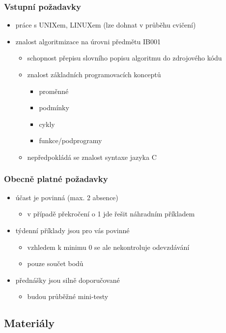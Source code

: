 \begin{frame}
	\frametitle{Vstupní požadavky}
	\begin{itemize}
		\item{práce s UNIXem, LINUXem (lze dohnat v průběhu cvičení)}
		\item{znalost algoritmizace na úrovni předmětu IB001}
		\begin{itemize}
			\item{schopnost přepisu slovního popisu algoritmu do zdrojového kódu}
			\item{znalost základních programovacích konceptů}
			\begin{itemize}
				\item{proměnné}
				\item{podmínky}
				\item{cykly}
				\item{funkce/podprogramy}
			\end{itemize}
			\item{nepředpokládá se znalost syntaxe jazyka C}
		\end{itemize}
	\end{itemize}
\end{frame}

\begin{frame}
	\frametitle{Obecně platné požadavky}
	\begin{itemize}
		\item{účast je povinná (max. 2 absence)}
		\begin{itemize}
			\item{v případě překročení o 1 jde řešit náhradním příkladem}
		\end{itemize}
		\item{týdenní příklady jsou pro vás povinné}
		\begin{itemize}
			\item{vzhledem k minimu 0 se ale nekontroluje odevzdávání}
			\item{pouze součet bodů}
		\end{itemize}
		\item{přednášky jsou silně doporučované}
		\begin{itemize}
			\item{budou průběžné mini-testy}
		\end{itemize}
	\end{itemize}
\end{frame}

\subsection{Materiály}


